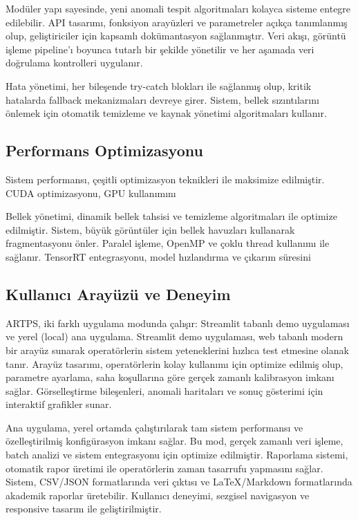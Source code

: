 \documentclass[12pt]{article}
\begin{document}
Modüler yapı sayesinde, yeni anomali tespit algoritmaları kolayca sisteme entegre edilebilir. API tasarımı, fonksiyon arayüzleri ve parametreler açıkça tanımlanmış olup, geliştiriciler için kapsamlı dokümantasyon sağlanmıştır. Veri akışı, görüntü işleme pipeline'ı boyunca tutarlı bir şekilde yönetilir ve her aşamada veri doğrulama kontrolleri uygulanır.

Hata yönetimi, her bileşende try-catch blokları ile sağlanmış olup, kritik hatalarda fallback mekanizmaları devreye girer. Sistem, bellek sızıntılarını önlemek için otomatik temizleme ve kaynak yönetimi algoritmaları kullanır.

\subsection{Performans Optimizasyonu}
Sistem performansı, çeşitli optimizasyon teknikleri ile maksimize edilmiştir. CUDA optimizasyonu, GPU kullanımını %

Bellek yönetimi, dinamik bellek tahsisi ve temizleme algoritmaları ile optimize edilmiştir. Sistem, büyük görüntüler için bellek havuzları kullanarak fragmentasyonu önler. Paralel işleme, OpenMP ve çoklu thread kullanımı ile sağlanır. TensorRT entegrasyonu, model hızlandırma ve çıkarım süresini %

\subsection{Kullanıcı Arayüzü ve Deneyim}
ARTPS, iki farklı uygulama modunda çalışır: Streamlit tabanlı demo uygulaması ve yerel (local) ana uygulama. Streamlit demo uygulaması, web tabanlı modern bir arayüz sunarak operatörlerin sistem yeteneklerini hızlıca test etmesine olanak tanır. Arayüz tasarımı, operatörlerin kolay kullanımı için optimize edilmiş olup, parametre ayarlama, saha koşullarına göre gerçek zamanlı kalibrasyon imkanı sağlar. Görselleştirme bileşenleri, anomali haritaları ve sonuç gösterimi için interaktif grafikler sunar.

Ana uygulama, yerel ortamda çalıştırılarak tam sistem performansı ve özelleştirilmiş konfigürasyon imkanı sağlar. Bu mod, gerçek zamanlı veri işleme, batch analizi ve sistem entegrasyonu için optimize edilmiştir. Raporlama sistemi, otomatik rapor üretimi ile operatörlerin zaman tasarrufu yapmasını sağlar. Sistem, CSV/JSON formatlarında veri çıktısı ve LaTeX/Markdown formatlarında akademik raporlar üretebilir. Kullanıcı deneyimi, sezgisel navigasyon ve responsive tasarım ile geliştirilmiştir.
\end{document}
